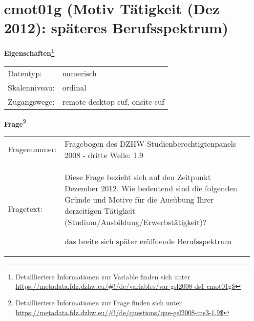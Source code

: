 
    \setcounter{footnote}{0}

    \vspace*{-1.8cm}
	\section{cmot01g (Motiv Tätigkeit (Dez 2012): späteres Berufsspektrum)}
	\label{section:cmot01g}



    \vspace*{0.5cm}
    \noindent\textbf{Eigenschaften\footnote{Detailliertere Informationen zur Variable finden sich unter
		\url{https://metadata.fdz.dzhw.eu/\#!/de/variables/var-gsl2008-ds1-cmot01g$}}}\\
	\begin{tabularx}{\hsize}{@{}lX}
	Datentyp: & numerisch \\
	Skalenniveau: & ordinal \\
	Zugangswege: &
	  remote-desktop-suf, 
	  onsite-suf
 \\
    \end{tabularx}



				\vspace*{0.5cm}
                \noindent\textbf{Frage\footnote{Detailliertere Informationen zur Frage finden sich unter
		              \url{https://metadata.fdz.dzhw.eu/\#!/de/questions/que-gsl2008-ins3-1.9$}}}\\
				\begin{tabularx}{\hsize}{@{}lX}
					Fragenummer: &
					  Fragebogen des DZHW-Studienberechtigtenpanels 2008 - dritte Welle:
					  1.9
 \\
					Fragetext: & Diese Frage bezieht sich auf den Zeitpunkt Dezember 2012. Wie bedeutend sind die folgenden Gründe und Motive für die Ausübung Ihrer derzeitigen Tätigkeit (Studium/Ausbildung/Erwerbstätigkeit)?\par  das breite sich später eröffnende Berufsspektrum \\
				\end{tabularx}





